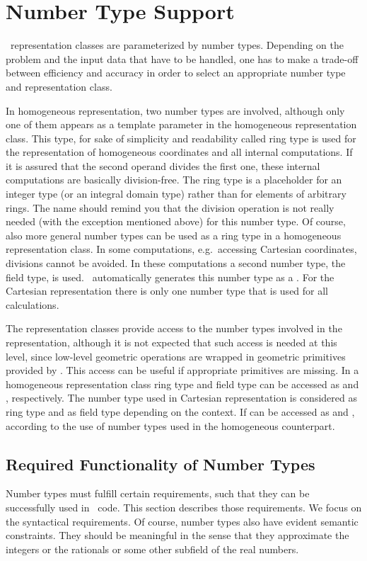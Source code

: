 \cleardoublepage
\chapter{Number Type Support}\label{Numbertype}

\cgal\ representation classes are parameterized by number types.  
Depending on the problem and the input data that have to be handled,
one has to make a trade-off between efficiency and accuracy in 
order to select an appropriate number type and representation class.

In homogeneous representation, two number types are involved,
although only one of them appears as a template parameter in
the homogeneous representation class.
This type, for sake of simplicity and readability called ring type is
used for the representation of homogeneous coordinates and all 
internal computations. 
If it is assured that the second operand divides the first one, these 
internal computations are basically division-free.
The ring type is a placeholder for an integer type (or an integral 
domain type) rather than for elements of arbitrary rings. 
The name should remind you that the division operation is not
really needed (with the exception mentioned above) for this number type.
Of course, also more general number types can be used as a ring type 
in a homogeneous representation class. In some computations, e.g.\ accessing 
Cartesian coordinates, divisions cannot be avoided. In these computations a 
second number type, the field type, is used. \cgal\ automatically generates 
this number type as a . For the Cartesian representation 
there is only one number type that is used for all calculations.

The representation classes provide access to the number types 
involved in the representation, although it is not expected that
such access is needed at this level, since low-level geometric 
operations are wrapped in geometric primitives provided by \cgal.
This access can be useful if appropriate primitives are missing.
In a homogeneous representation class  ring type and field
type can be accessed as  and , respectively.
The number type used in Cartesian representation is considered as 
ring type and as field type depending on the context.
If can be accessed as  and , according
to the use of number types used in the homogeneous counterpart.

\section{Required Functionality of Number Types\label{nt-requirements}}
Number types must fulfill certain requirements, such that they can
be successfully used in \cgal\ code.
This section describes those requirements.
We focus on the syntactical requirements. Of course, number types also
have evident semantic constraints. They should be meaningful in the
sense that they approximate the integers or the rationals 
or some other subfield of the real numbers.

